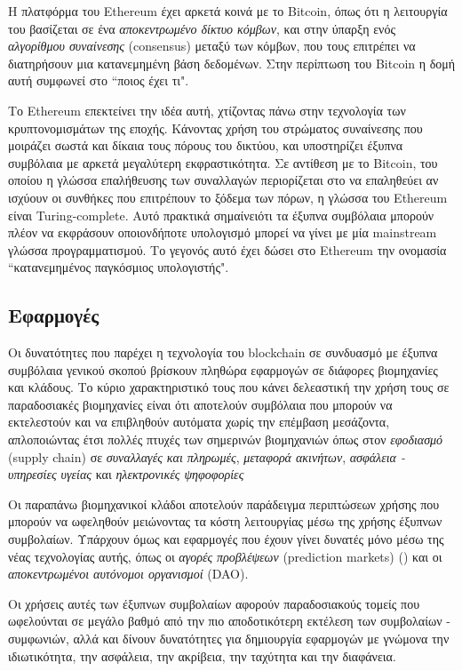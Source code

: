 Η πλατφόρμα του Ethereum έχει αρκετά κοινά με το Bitcoin, όπως ότι η λειτουργία του βασίζεται σε ένα
\textit{αποκεντρωμένο δίκτυο κόμβων}, και στην ύπαρξη ενός \textit{αλγορίθμου συναίνεσης} (consensus) μεταξύ των κόμβων,
που τους επιτρέπει να διατηρήσουν μια κατανεμημένη βάση δεδομένων. Στην περίπτωση του Bitcoin η δομή
αυτή συμφωνεί στο ``ποιος έχει τι".

Το Ethereum επεκτείνει την ιδέα αυτή, χτίζοντας πάνω στην τεχνολογία των κρυπτονομισμάτων της εποχής.
Κάνοντας χρήση του στρώματος συναίνεσης που μοιράζει σωστά και δίκαια τους πόρους του δικτύου, και
υποστηρίζει
έξυπνα συμβόλαια με αρκετά μεγαλύτερη εκφραστικότητα. Σε αντίθεση με το Bitcoin, του οποίου η γλώσσα επαλήθευσης
των συναλλαγών περιορίζεται στο να επαληθεύει αν ισχύουν οι συνθήκες που επιτρέπουν το ξόδεμα των πόρων,
η γλώσσα του Ethereum είναι Turing-complete. Αυτό πρακτικά σημαίνειότι τα έξυπνα
συμβόλαια μπορούν πλέον να εκφράσουν οποιονδήποτε υπολογισμό μπορεί να γίνει με μία mainstream
γλώσσα προγραμματισμού. Το γεγονός αυτό έχει δώσει στο Ethereum την ονομασία ``κατανεμημένος
παγκόσμιος υπολογιστής".


\subsection{Εφαρμογές}

Οι δυνατότητες που παρέχει η τεχνολογία του blockchain σε συνδυασμό με έξυπνα συμβόλαια γενικού
σκοπού βρίσκουν πληθώρα εφαρμογών σε διάφορες βιομηχανίες και κλάδους. Το κύριο χαρακτηριστικό
τους που κάνει δελεαστική την χρήση τους σε παραδοσιακές βιομηχανίες είναι ότι αποτελούν συμβόλαια
που μπορούν να εκτελεστούν και να επιβληθούν αυτόματα χωρίς την επέμβαση μεσάζοντα, απλοποιώντας
έτσι πολλές πτυχές των σημερινών βιομηχανιών όπως στον \textit{εφοδιασμό} (supply chain) σε \textit{συναλλαγές και πληρωμές},
  \textit{μεταφορά ακινήτων},
\textit{ασφάλεια - υπηρεσίες υγείας}
και \textit{ηλεκτρονικές ψηφοφορίες}


Οι παραπάνω βιομηχανικοί κλάδοι αποτελούν παράδειγμα περιπτώσεων χρήσης που μπορούν να ωφεληθούν
μειώνοντας τα κόστη λειτουργίας μέσω της χρήσης έξυπνων συμβολαίων. Υπάρχουν όμως και εφαρμογές
που έχουν γίνει δυνατές μόνο μέσω της νέας τεχνολογίας αυτής, όπως οι \emph{αγορές προβλέψεων}
(prediction markets) (\cite{augur}) και οι \emph{αποκεντρωμένοι αυτόνομοι οργανισμοί} (DAO).

Οι χρήσεις αυτές των έξυπνων συμβολαίων αφορούν παραδοσιακούς τομείς που ωφελούνται σε μεγάλο
βαθμό από την πιο αποδοτικότερη εκτέλεση των συμβολαίων - συμφωνιών, αλλά και δίνουν δυνατότητες
για δημιουργία εφαρμογών με γνώμονα την ιδιωτικότητα, την ασφάλεια, την ακρίβεια, την ταχύτητα και την
διαφάνεια.

